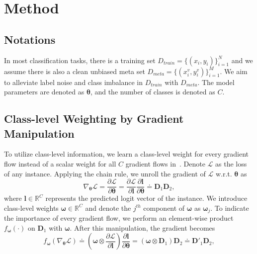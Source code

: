 \section{Method}
\label{method}
\subsection{Notations}
%
In most classification tasks, there is a training set $D_{train}=\{(x_i, y_i)\}_{i=1}^N$ and we assume there is also a clean unbiased meta set $D_{meta}=\{(x_i^v, y_i^v)\}_{i=1}^M$.
%
We aim to alleviate label noise and class imbalance in  $D_{train}$ with $D_{meta}$.
%
The model parameters are denoted as $\boldsymbol \theta$, and the number of classes is denoted as $C$.

\subsection{Class-level Weighting by Gradient Manipulation}
\label{subsec:gradManip}
%
To utilize class-level information, we learn a class-level weight for every gradient flow instead of a scalar weight for all $C$ gradient flows in~\cite{shuMetaWeightNetLearningExplicit2019a}.
%
Denote $\mathcal{L}$ as the loss of any instance.
%
Applying the chain rule, we unroll the gradient of $\mathcal{L}$ w.r.t. $\boldsymbol \theta$ as
\begin{equation}
    \label{eq:chainRule}
    \nabla_{\boldsymbol \theta} \mathcal{L}= \frac{\partial \mathcal{L}}{\partial \mathbf{\boldsymbol \theta}} = \frac{\partial \mathcal{L}}{\partial \mathbf{l}} \frac{\partial \mathbf{l}}{\partial \mathbf{\boldsymbol \theta}} \doteq \mathbf{D}_{1}\mathbf{D}_{2},
\end{equation}
where $\mathbf{l}\in\mathbb{R}^C$ represents the predicted logit vector of the instance.
%
We introduce class-level weights $\boldsymbol \omega \in\mathbb{R}^C$ and denote the $j^{th}$ component of $\boldsymbol \omega$ as $\boldsymbol \omega_j$.
%
To indicate the importance of every gradient flow, we perform an element-wise product $f_{\boldsymbol \omega}(\cdot)$ on $\mathbf{D}_1$ with $\boldsymbol \omega$.
%
After this manipulation, the gradient becomes
\begin{equation}
    \label{eq:newGrad}
    f_{\boldsymbol \omega}\left(\nabla_{\boldsymbol \theta} \mathcal{L}\right) \doteq \left(\boldsymbol \omega \otimes \frac{\partial \mathcal L}{\partial \mathbf{l}}\right) \frac{\partial \mathbf{l}}{\partial \boldsymbol \theta} = \left(\boldsymbol \omega \otimes \mathbf{D}_1\right) \mathbf{D}_2 \doteq \mathbf{D}'_1\mathbf{D}_2,
\end{equation}
